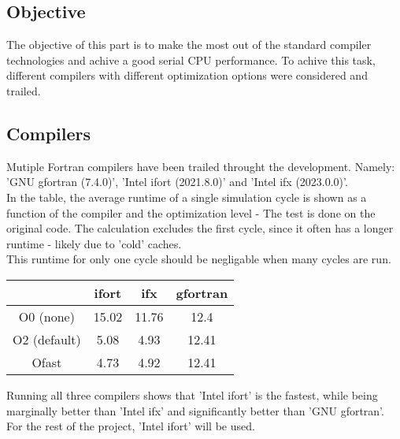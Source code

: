 \subsection*{Objective}
The objective of this part is to make the most out of
the standard compiler technologies and achive a good serial CPU performance.
To achive this task, different compilers with different optimization options
were considered and trailed.

\subsection*{Compilers}
Mutiple Fortran compilers have been trailed throught
the development. Namely: 'GNU gfortran (7.4.0)', 'Intel ifort (2021.8.0)' and 'Intel ifx (2023.0.0)'.\\
In the table, the average runtime of a single simulation cycle is shown as a function of the compiler
and the optimization level - The test is done on the original code.
The calculation excludes the first cycle, since it often has
a longer runtime - likely due to 'cold' caches.\\
This runtime for only one cycle should be negligable
when many cycles are run.
\begin{center}
\begin{tabular}{| c |  c  c  c |}
    \hline
                 & ifort    & ifx       & gfortran\\
    \hline
    O0 (none)    & 15.02    & 11.76     & 12.4 \\ 
    O2 (default) & 5.08     & 4.93     & 12.41 \\  
    Ofast        & 4.73     & 4.92      & 12.41    \\
    \hline
\end{tabular}
\end{center}


Running all three compilers shows that 'Intel ifort' is the fastest,
while being marginally better than 'Intel ifx' and significantly better than 'GNU gfortran'.\\
For the rest of the project, 'Intel ifort' will be used.

